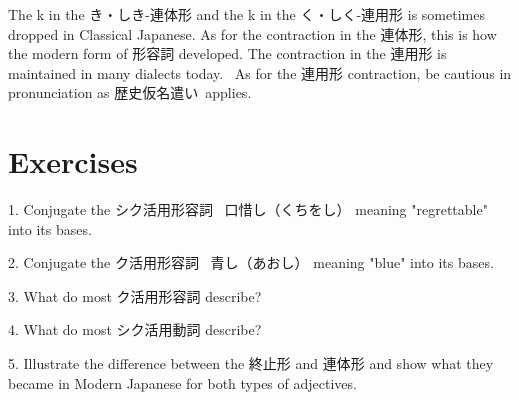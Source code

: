 \par{The k in the き・しき-連体形 and the k in the く・しく-連用形 is sometimes dropped in Classical Japanese. As for the contraction in the 連体形, this is how the modern form of 形容詞 developed. The contraction in the 連用形 is maintained in many dialects today.  As for the 連用形 contraction, be cautious in pronunciation as 歴史仮名遣い applies. }
      
\section{Exercises}
 
\par{1. Conjugate the シク活用形容詞  口惜し（くちをし） meaning "regrettable" into its bases. }

\par{2. Conjugate the ク活用形容詞  青し（あおし） meaning "blue" into its bases. }

\par{3. What do most ク活用形容詞 describe? }

\par{4. What do most シク活用動詞 describe? }

\par{5. Illustrate the difference between the 終止形 and 連体形 and show what they became in Modern Japanese for both types of adjectives. }
    